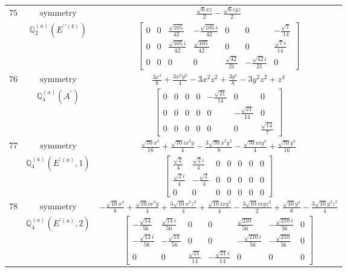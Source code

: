 \documentclass[fleqn,8pt,landscape]{jsarticle}
\begin{document}
\begin{longtable}{ccc}
$ 75 $ & $ \text{symmetry} $ & $ \frac{\sqrt{6} x z}{2} - \frac{\sqrt{6} i y z}{2} $ \\
$  $ & $ \mathbb{Q}_{2}^{(a)}(E^{\prime\prime(b)}) $ & $ \begin{bmatrix} 0 & 0 & \frac{\sqrt{105}}{42} & - \frac{\sqrt{105} i}{42} & 0 & 0 & - \frac{\sqrt{7}}{14} \\ 0 & 0 & \frac{\sqrt{105} i}{42} & \frac{\sqrt{105}}{42} & 0 & 0 & \frac{\sqrt{7} i}{14} \\ 0 & 0 & 0 & 0 & \frac{\sqrt{42}}{21} & - \frac{\sqrt{42} i}{21} & 0 \end{bmatrix} $ \\ \hline
$ 76 $ & $ \text{symmetry} $ & $ \frac{3 x^{4}}{8} + \frac{3 x^{2} y^{2}}{4} - 3 x^{2} z^{2} + \frac{3 y^{4}}{8} - 3 y^{2} z^{2} + z^{4} $ \\
$  $ & $ \mathbb{Q}_{4}^{(a)}(A^{\prime}) $ & $ \begin{bmatrix} 0 & 0 & 0 & 0 & - \frac{\sqrt{21}}{14} & 0 & 0 \\ 0 & 0 & 0 & 0 & 0 & - \frac{\sqrt{21}}{14} & 0 \\ 0 & 0 & 0 & 0 & 0 & 0 & \frac{\sqrt{14}}{7} \end{bmatrix} $ \\ \hline
$ 77 $ & $ \text{symmetry} $ & $ \frac{\sqrt{70} x^{4}}{16} + \frac{\sqrt{70} i x^{3} y}{4} - \frac{3 \sqrt{70} x^{2} y^{2}}{8} - \frac{\sqrt{70} i x y^{3}}{4} + \frac{\sqrt{70} y^{4}}{16} $ \\
$  $ & $ \mathbb{Q}_{4}^{(a)}(E^{\prime(a)},1) $ & $ \begin{bmatrix} \frac{\sqrt{2}}{4} & \frac{\sqrt{2} i}{4} & 0 & 0 & 0 & 0 & 0 \\ \frac{\sqrt{2} i}{4} & - \frac{\sqrt{2}}{4} & 0 & 0 & 0 & 0 & 0 \\ 0 & 0 & 0 & 0 & 0 & 0 & 0 \end{bmatrix} $ \\ \hline
$ 78 $ & $ \text{symmetry} $ & $ - \frac{\sqrt{10} x^{4}}{8} + \frac{\sqrt{10} i x^{3} y}{4} + \frac{3 \sqrt{10} x^{2} z^{2}}{4} + \frac{\sqrt{10} i x y^{3}}{4} - \frac{3 \sqrt{10} i x y z^{2}}{2} + \frac{\sqrt{10} y^{4}}{8} - \frac{3 \sqrt{10} y^{2} z^{2}}{4} $ \\
$  $ & $ \mathbb{Q}_{4}^{(a)}(E^{\prime(a)},2) $ & $ \begin{bmatrix} - \frac{\sqrt{14}}{56} & \frac{\sqrt{14} i}{56} & 0 & 0 & \frac{\sqrt{210}}{56} & - \frac{\sqrt{210} i}{56} & 0 \\ - \frac{\sqrt{14} i}{56} & - \frac{\sqrt{14}}{56} & 0 & 0 & - \frac{\sqrt{210} i}{56} & - \frac{\sqrt{210}}{56} & 0 \\ 0 & 0 & \frac{\sqrt{21}}{14} & - \frac{\sqrt{21} i}{14} & 0 & 0 & 0 \end{bmatrix} $ \\ \hline

\end{longtable}
\end{document}
